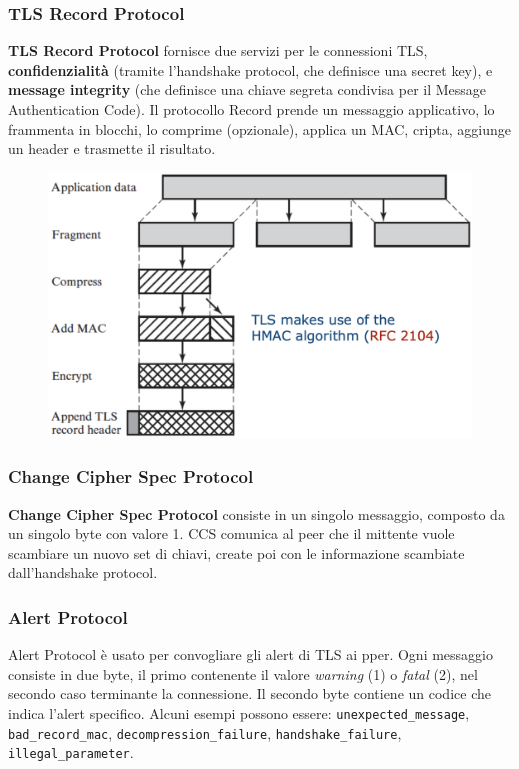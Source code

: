 \documentclass[11pt]{article}
\begin{document}
\subsubsection{TLS Record Protocol}
\textbf{TLS Record Protocol} fornisce due servizi per le connessioni TLS, \textbf{confidenzialità} (tramite l'handshake protocol, che definisce una secret key), e \textbf{message integrity} (che definisce una chiave segreta condivisa per il Message Authentication Code). Il protocollo Record prende un messaggio applicativo, lo frammenta in blocchi, lo comprime (opzionale), applica un MAC, cripta, aggiunge un header e trasmette il risultato. 
\begin{figure}[H]
    \centering
    \includegraphics[width=0.7\linewidth]{res/crypto/TLSRecord.png}
\end{figure}
\subsubsection{Change Cipher Spec Protocol}
\textbf{Change Cipher Spec Protocol} consiste in un singolo messaggio, composto da un singolo byte con valore 1. CCS comunica al peer che il mittente vuole scambiare un nuovo set di chiavi, create poi con le informazione scambiate dall'handshake protocol. 
\subsubsection{Alert Protocol}
Alert Protocol è usato per convogliare gli alert di TLS ai pper. Ogni messaggio consiste in due byte, il primo contenente il valore \textit{warning} (1) o \textit{fatal} (2), nel secondo caso terminante la connessione. Il secondo byte contiene un codice che indica l'alert specifico. 
Alcuni esempi possono essere: \verb|unexpected_message|, \verb|bad_record_mac|, \verb|decompression_failure|, \verb|handshake_failure|, \verb|illegal_parameter|.
\end{document}
